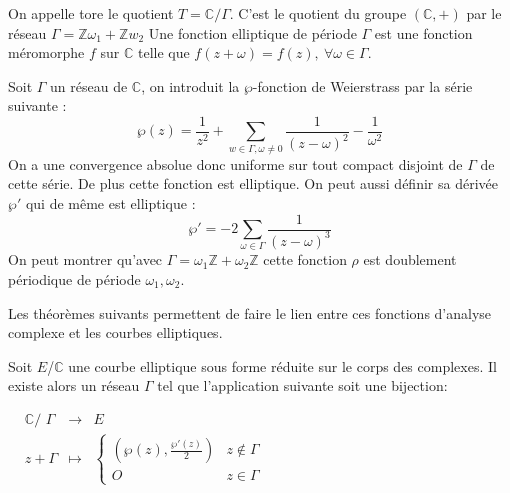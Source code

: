 \documentclass[12pt]{article}
\begin{document}
\begin{defi}
On appelle tore le quotient $T = \mathbb{C}/ \Gamma$. C'est le quotient du groupe $(\mathbb{C}, +)$ par le réseau $\Gamma = \mathbb{Z}\omega_1 + \mathbb{Z}w_2$
\newline
Une fonction elliptique de période $\Gamma$ est une fonction méromorphe $f$ sur $\mathbb{C}$ telle que $f(z + \omega) = f(z) ,\ \forall \omega \in \Gamma$.
\end{defi}

\begin{defi}
Soit $\Gamma$ un réseau de $\mathbb{C}$, on introduit la $\wp$-fonction de Weierstrass par la série suivante :
\begin{equation*}
\wp(z) = \frac{1}{z^2} + \sum_{w \in \Gamma, \omega \ne 0} \frac{1}{(z-\omega)^2} - \frac{1}{\omega^2}
\end{equation*}
On a une convergence absolue donc uniforme sur tout compact disjoint de $\Gamma$ de cette série. De plus cette fonction est elliptique. On peut aussi définir sa dérivée ${\wp'}$ qui de même est elliptique :
\begin{equation*}
{\wp'} = -2 \sum_{\omega \in \Gamma} \frac{1}{(z-\omega)^3}
\end{equation*}
On peut montrer qu'avec $\Gamma = \omega_1 \mathbb{Z} + \omega_2 \mathbb{Z}$ cette fonction $\rho$ est doublement périodique de période $\omega_1, \omega_2$.
\end{defi}

Les théorèmes suivants permettent de faire le lien entre ces fonctions d'analyse complexe et les courbes elliptiques.

\begin{thm}
Soit $E$/$\mathbb{C}$ une courbe elliptique sous forme réduite sur le corps des complexes. Il existe alors un réseau $\Gamma$ tel que l'application suivante soit une bijection:
\newline
\medskip


$\begin{array}{cccc}
& \mathbb{C}\text{/ }\Gamma & \to & E \\
& z + \Gamma & \mapsto & \left\lbrace
\begin{array}{cc}
 (\wp(z), \frac{{\wp'}(z)}{2})  & z \notin \Gamma \\
 O & z \in \Gamma
\end{array}\right.\\
\end{array}$
\end{thm}
\end{document}
